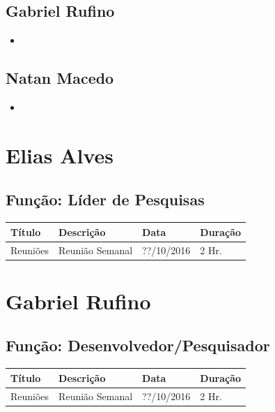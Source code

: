 \documentclass[a4paper, 12pt]{article}
\newcommand\datareuniao{??/10/2016}
\begin{document}
\subsection*{Gabriel Rufino}
\begin{itemize}
	\item 
\end{itemize}

\subsection*{Natan Macedo}
\begin{itemize}
	\item 
\end{itemize}

\clearpage


\section*{Elias Alves}
\subsection*{Função: Líder de Pesquisas}

\begin{tabularx}{\linewidth}{l|X|l|l} \toprule
    \bfseries Título & \bfseries Descrição & \bfseries Data & \bfseries Duração
    \\ \midrule
    Reuniões & Reunião Semanal & \datareuniao & 2 Hr.
    \\ \bottomrule
\end{tabularx}



\section*{Gabriel Rufino}
\subsection*{Função: Desenvolvedor/Pesquisador}

\begin{tabularx}{\linewidth}{l|X|l|l} \toprule
    \bfseries Título & \bfseries Descrição & \bfseries Data & \bfseries Duração
    \\ \midrule
    Reuniões & Reunião Semanal & \datareuniao & 2 Hr.
    \\ \bottomrule
\end{tabularx}
\end{document}
